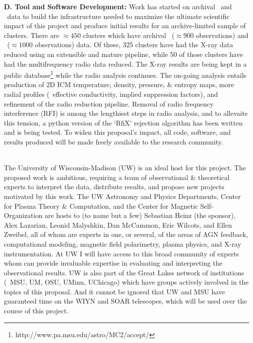 \documentclass[letterpaper,12pt]{article}
\newcommand{\myhead}{Cavagnolo, Jansky Proposal}
\begin{document}
{\bf{D. Tool and Software Development:}} Work has started on archival
\chandra\ and \vla\ data to build the infrastructure needed to
maximize the ultimate scientific impact of this project and produce
initial results for an archive-limited sample of clusters. There are
$\approx 450$ clusters which have archival \chandra\ ($\approx 900$
observations) and \vla\ ($\approx 1000$ observations) data. Of these,
325 clusters have had the X-ray data reduced using an extensible and
mature pipeline, while 50 of those clusters have had the
multifrequency radio data reduced. The X-ray results are being kept in
a public database\footnote{http://www.pa.msu.edu/astro/MC2/accept/}
while the radio analysis continues. The on-going analysis entails
production of 2D ICM temperature, density, pressure, \& entropy maps,
more radial profiles (\eg\ effective conductivity, implied suppression
factors), and refinement of the radio reduction pipeline. Removal of
radio frequency interference (RFI) is among the lengthiest steps in
radio analysis, and to allevaite this tension, a python version of the
`RfiX' rejection algorithm \citep{rfix} has been written and is being
tested. To widen this proposal's impact, all code, software, and
results produced will be made freely available to the research
community.\\

\markright{\myhead}\\
\indent The University of Wisconsin-Madison (UW) is an ideal host for
this project. The proposed work is ambitious, requiring a team of
observational \& theoretical experts to interpret the data, distribute
results, and propose new projects motivated by this work. The UW
Astronomy and Physics Departments, Center for Plasma Theory \&
Computation, and the Center for Magnetic Self-Organization are hosts
to (to name but a few) Sebastian Heinz (the sponsor), Alex Lazarian,
Leonid Malyshkin, Dan McCammon, Eric Wilcots, and Ellen Zweibel, all
of whom are experts in one, or several, of the areas of AGN feedback,
computational modeling, magnetic field polarimetry, plasma physics,
and X-ray instrumentation. At UW I will have access to this broad
community of experts whom can provide invaluable expertise in
evaluating and interpreting the observational results. UW is also part
of the Great Lakes network of institutions (\eg\ MSU, UM, OSU, UMinn,
UChicago) which have groups actively involved in the topics of this
proposal. And it cannot be ignored that UW and MSU have guaranteed
time on the WIYN and SOAR telescopes, which will be used over the
course of this project.
\end{document}
